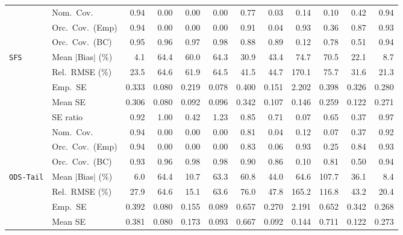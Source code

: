 \begin{landscape}
\begin{longtable}{llrrrrrrrrrr}
 & Nom.\ Cov. & \cellcolor{ranktwo}0.94 & 0.00 & 0.00 & 0.00 & \cellcolor{rankthree}0.77 & 0.03 & 0.14 & 0.10 & 0.42 & \cellcolor{rankone}0.94 \\
 & Orc.\ Cov.\ (Emp) & \cellcolor{rankone}0.94 & 0.00 & 0.00 & 0.00 & 0.91 & 0.04 & \cellcolor{rankthree}0.93 & 0.36 & 0.87 & \cellcolor{ranktwo}0.93 \\
 & Orc.\ Cov.\ (BC) & \cellcolor{rankone}0.95 & \cellcolor{rankthree}0.96 & 0.97 & 0.98 & 0.88 & 0.89 & 0.12 & 0.78 & 0.51 & \cellcolor{ranktwo}0.94 \\
\addlinespace[2pt]
\quad \texttt{SFS} & Mean $|$Bias$|$ (\%) & \cellcolor{rankone}4.1 & 64.4 & 60.0 & 64.3 & 30.9 & 43.4 & 74.7 & 70.5 & \cellcolor{rankthree}22.1 & \cellcolor{ranktwo}8.7 \\
 & Rel.\ RMSE (\%) & \cellcolor{ranktwo}23.5 & 64.6 & 61.9 & 64.5 & 41.5 & 44.7 & 170.1 & 75.7 & \cellcolor{rankthree}31.6 & \cellcolor{rankone}21.3 \\
 & Emp.\ SE & 0.333 & 0.080 & 0.219 & 0.078 & 0.400 & 0.151 & 2.202 & 0.398 & 0.326 & 0.280 \\
 & Mean SE & 0.306 & 0.080 & 0.092 & 0.096 & 0.342 & 0.107 & 0.146 & 0.259 & 0.122 & 0.271 \\
 & SE ratio & \cellcolor{rankthree}0.92 & \cellcolor{rankone}1.00 & 0.42 & 1.23 & 0.85 & 0.71 & 0.07 & 0.65 & 0.37 & \cellcolor{ranktwo}0.97 \\
 & Nom.\ Cov. & \cellcolor{rankone}0.94 & 0.00 & 0.00 & 0.00 & \cellcolor{rankthree}0.81 & 0.04 & 0.12 & 0.07 & 0.37 & \cellcolor{ranktwo}0.92 \\
 & Orc.\ Cov.\ (Emp) & \cellcolor{rankone}0.94 & 0.00 & 0.00 & 0.00 & 0.83 & 0.06 & \cellcolor{rankthree}0.93 & 0.25 & 0.84 & \cellcolor{ranktwo}0.93 \\
 & Orc.\ Cov.\ (BC) & \cellcolor{rankthree}0.93 & \cellcolor{rankone}0.96 & 0.98 & 0.98 & 0.90 & 0.86 & 0.10 & 0.81 & 0.50 & \cellcolor{ranktwo}0.94 \\
\addlinespace[2pt]
\quad \texttt{ODS-Tail} & Mean $|$Bias$|$ (\%) & \cellcolor{rankone}6.0 & 64.4 & \cellcolor{rankthree}10.7 & 63.3 & 60.8 & 44.0 & 64.6 & 107.7 & 36.1 & \cellcolor{ranktwo}8.4 \\
 & Rel.\ RMSE (\%) & \cellcolor{rankthree}27.9 & 64.6 & \cellcolor{rankone}15.1 & 63.6 & 76.0 & 47.8 & 165.2 & 116.8 & 43.2 & \cellcolor{ranktwo}20.4 \\
 & Emp.\ SE & 0.392 & 0.080 & 0.155 & 0.089 & 0.657 & 0.270 & 2.191 & 0.652 & 0.342 & 0.268 \\
 & Mean SE & 0.381 & 0.080 & 0.173 & 0.093 & 0.667 & 0.092 & 0.144 & 0.711 & 0.122 & 0.273 \\

\end{longtable}
\end{landscape}
